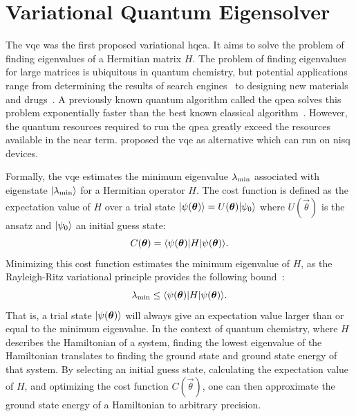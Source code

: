 \section{Variational Quantum Eigensolver}
The \gls{vqe} was the first proposed variational \gls{hqca}.
It aims to solve the problem of finding eigenvalues of a Hermitian matrix $H$.
The problem of finding eigenvalues for large matrices is ubiquitous in quantum chemistry, but potential applications range from determining the results of search engines~\cite{page1999pagerank} to designing new materials and drugs~\cite{golub2000eigenvalue}.
A previously known quantum algorithm called the \acrfull{qpea} solves this problem exponentially faster than the best known classical algorithm~\cite{abrams1999quantum}.
However, the quantum resources required to run the \gls{qpea} greatly exceed the resources available in the near term.
\textcite{peruzzo2014variational} proposed the \gls{vqe} as alternative which can run on \gls{nisq} devices.

Formally, the \gls{vqe} estimates the minimum eigenvalue $\lambda_{\textnormal{min}}$ associated with eigenstate $\vert{\lambda_{\textnormal{min}}}\rangle$ for a Hermitian operator $H$.
The cost function is defined as the expectation value of $H$ over a trial state $\vert{\psi({\bm{\theta}})}\rangle = U(\bm{\theta})\vert{\psi_0}\rangle$ where $U(\vec{\theta})$ is the ansatz and $\vert{\psi_0}\rangle$ an initial guess state:
\begin{equation}
C(\bm{\theta}) = \langle{\psi(\bm{\theta})}\vert H\vert{\psi(\bm{\theta})}\rangle.
\end{equation}
Minimizing this cost function estimates the minimum eigenvalue of $H$, as the Rayleigh-Ritz variational principle provides the following bound~\cite{ritz1909neue}:
\begin{equation}
\lambda_{\textnormal{min}} \leq \langle{\psi(\bm{\theta})}\vert H\vert{\psi(\bm{\theta})}\rangle.
\end{equation}
That is, a trial state $\vert{\psi({\bm{\theta}})}\rangle$ will always give an expectation value larger than or equal to the minimum eigenvalue.
In the context of quantum chemistry, where $H$ describes the Hamiltonian of a system, finding the lowest eigenvalue of the Hamiltonian translates to finding the ground state and ground state energy of that system.
By selecting an initial guess state, calculating the expectation value of $H$, and optimizing the cost function $C(\vec{\theta})$, one can then approximate the ground state energy of a Hamiltonian to arbitrary precision.


